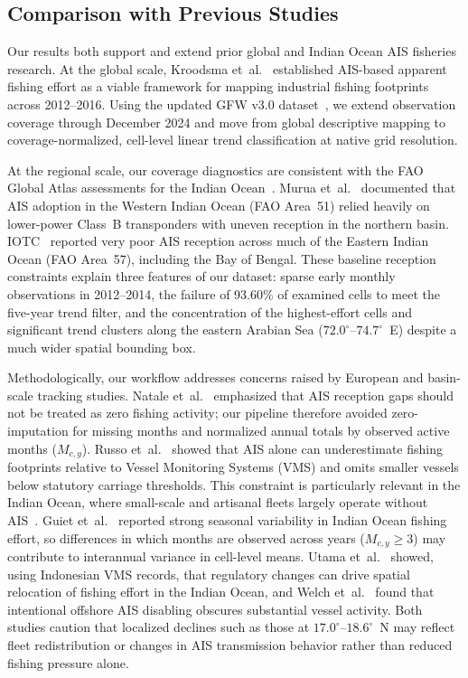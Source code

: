 \documentclass[pdflatex,sn-mathphys-num]{sn-jnl}
\theoremstyle{thmstyleone}
\theoremstyle{thmstyletwo}
\theoremstyle{thmstylethree}
\begin{document}
\subsection{Comparison with Previous Studies}\label{subsec:disc-comparison}

Our results both support and extend prior global and Indian Ocean AIS fisheries research. At the global scale, Kroodsma et~al.~\cite{kroodsma2018} established AIS-based apparent fishing effort as a viable framework for mapping industrial fishing footprints across 2012--2016. Using the updated GFW v3.0 dataset~\cite{gfw2025}, we extend observation coverage through December 2024 and move from global descriptive mapping to coverage-normalized, cell-level linear trend classification at native grid resolution.

At the regional scale, our coverage diagnostics are consistent with the FAO Global Atlas assessments for the Indian Ocean~\cite{taconet2019,murua2019,iotc2019}. Murua et~al.~\cite{murua2019} documented that AIS adoption in the Western Indian Ocean (FAO Area~51) relied heavily on lower-power Class~B transponders with uneven reception in the northern basin. IOTC~\cite{iotc2019} reported very poor AIS reception across much of the Eastern Indian Ocean (FAO Area~57), including the Bay of Bengal. These baseline reception constraints explain three features of our dataset: sparse early monthly observations in 2012--2014, the failure of 93.60\% of examined cells to meet the five-year trend filter, and the concentration of the highest-effort cells and significant trend clusters along the eastern Arabian Sea ($72.0^\circ$--$74.7^\circ$~E) despite a much wider spatial bounding box.

Methodologically, our workflow addresses concerns raised by European and basin-scale tracking studies. Natale et~al.~\cite{natale2015} emphasized that AIS reception gaps should not be treated as zero fishing activity; our pipeline therefore avoided zero-imputation for missing months and normalized annual totals by observed active months ($M_{c,y}$). Russo et~al.~\cite{russo2016} showed that AIS alone can underestimate fishing footprints relative to Vessel Monitoring Systems (VMS) and omits smaller vessels below statutory carriage thresholds. This constraint is particularly relevant in the Indian Ocean, where small-scale and artisanal fleets largely operate without AIS~\cite{murua2019}. Guiet et~al.~\cite{guiet2019} reported strong seasonal variability in Indian Ocean fishing effort, so differences in which months are observed across years ($M_{c,y} \ge 3$) may contribute to interannual variance in cell-level means. Utama et~al.~\cite{utama2021} showed, using Indonesian VMS records, that regulatory changes can drive spatial relocation of fishing effort in the Indian Ocean, and Welch et~al.~\cite{welch2022} found that intentional offshore AIS disabling obscures substantial vessel activity. Both studies caution that localized declines such as those at $17.0^\circ$--$18.6^\circ$~N may reflect fleet redistribution or changes in AIS transmission behavior rather than reduced fishing pressure alone.
\end{document}
